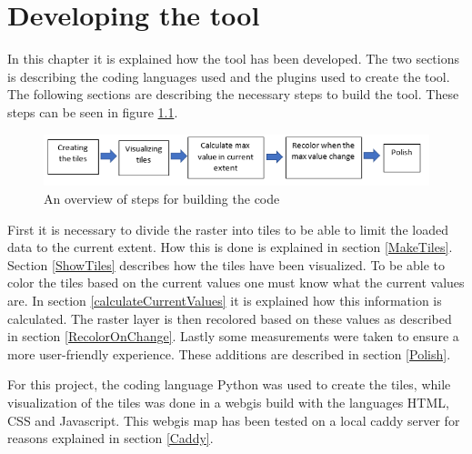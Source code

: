 \chapter{Developing the tool}\label{CDevelopingTool}

In this chapter it is explained how the tool has been developed. The two sections is describing the coding languages used and the plugins used to create the tool. The following sections are describing the necessary steps to build the tool. These steps can be seen in figure \ref{DevelopmentSteps}.


\begin{figure} [H]
	\centering
	\includegraphics[width=1\textwidth]{Pictures/DevelopmentSteps}
	\caption{An overview of steps for building the code}
	\label{DevelopmentSteps}
\end{figure}

First it is necessary to divide the raster into tiles to be able to limit the loaded data to the current extent. How this is done is explained in section \ref{MakeTiles}. Section \ref{ShowTiles} describes how the tiles have been visualized. To be able to color the tiles based on the current values one must know what the current values are. In section \ref{calculateCurrentValues} it is explained how this information is calculated. The raster layer is then recolored based on these values as described in section \ref{RecolorOnChange}. Lastly some measurements were taken to ensure a more user-friendly experience. These additions are described in section \ref{Polish}. 





For this project, the coding language Python was used to create the tiles, while visualization of the tiles was done in a webgis build with the languages HTML, CSS and Javascript. This webgis map has been tested on a local caddy server for reasons explained in section \ref{Caddy}.

